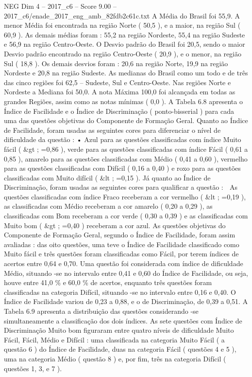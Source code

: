 \begin{textsample}{NEG Dim 4 – 2017\_c6 – Score 9.00 – 2017\_c6/enade\_2017\_eng\_amb\_82fdb2c61c.txt}
A Média do Brasil foi 55,9.
A menor Média foi encontrada na região Norte ( 50,5 ), e a maior, na região Sul ( 60,9 ).
As demais médias foram : 55,2 na região Nordeste, 55,4 na região Sudeste e 56,9 na região Centro-Oeste.
O Desvio padrão do Brasil foi 20,5, sendo o maior Desvio padrão encontrado na região Centro-Oeste ( 20,9 ), e o menor, na região Sul ( 18,8 ).
Os demais desvios foram : 20,6 na região Norte, 19,9 na região Nordeste e 20,8 na região Sudeste.
As medianas do Brasil como um todo e de três das cinco regiões foi 62,5 – Sudeste, Sul e Centro-Oeste.
Nas regiões Norte e Nordeste a Mediana foi 50,0.
A nota Máxima 100,0 foi alcançada em todas as grandes Regiões, assim como as notas mínimas ( 0,0 ).
A Tabela 6.8 apresenta o Índice de Facilidade e o Índice de Discriminação ( ponto-bisserial ) para cada uma das questões objetivas do Componente de Formação Geral.
Quanto ao Índice de Facilidade, foram usadas as seguintes cores para diferenciar o nível de dificuldade da questão : • Azul para as questões classificadas com índice Muito fácil ( \&gt ; =0,86 ), verde para as questões classificadas com índice Fácil ( 0,61 a 0,85 ), amarelo para as questões classificadas com Médio ( 0,41 a 0,60 ), vermelho para as questões classificadas com Difícil ( 0,16 a 0,40 ) e roxo para as questões classificadas com Muito difícil ( \&lt ; =0,15 ).
Já quanto ao Índice de Discriminação, foram usadas as seguintes cores para qualificar a questão :  As questões classificadas com índice Fraco receberam a cor vermelho ( \&lt ; =0,19 ), as classificadas com Médio receberam a cor amarelo ( 0,20 a 0,29 ), as classificadas com Bom receberam a cor verde ( 0,30 a 0,39 ) e as classificadas com Muito bom ( \&gt ; =0,40 ) receberam a cor azul.
As questões objetivas do Componente de Formação Geral, segundo o Índice de Facilidade, foram assim avaliadas : das oito questões, uma teve o Índice de Facilidade classificado como Muito fácil e três questões foram classificadas como Fácil, por terem índices de acertos entre 0,64 e 0,70.
Uma questão foi considerada com índice de dificuldade Médio, situando -se no intervalo entre 0,41 e 0,60 do Índice de Facilidade, ou seja, houve entre 41,0 \% e 60,0 \% de acertos, enquanto três questões foram classificadas na categoria Difícil, situando -se no intervalo entre 0,16 e 0,40.
O Índice de Facilidade variou de 0,23 a 0,88, e o de Discriminação, de 0,39 a 0,51.
A Tabela 6.9 apresenta a distribuição das questões considerando -se simultaneamente a classificação dos dois índices.
As sete questões com Índice de Discriminação Muito bom figuraram entre quatro níveis de dificuldade Muito Fácil, Fácil, Médio e Difícil : uma classificada na categoria Muito Fácil ( a questão 6 ) do Índice de Facilidade, duas na categoria Fácil ( questões 4 e 5 ), uma na categoria Médio ( questão 8 ) e, por fim, três na categoria Difícil ( questões 1, 3, e 7 ).

\end{textsample}
